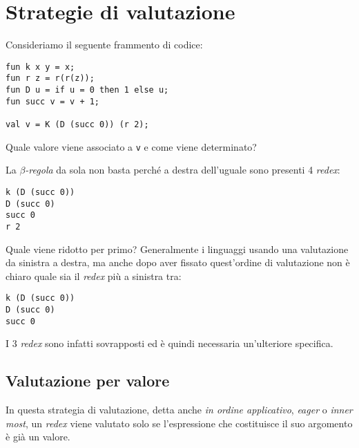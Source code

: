 \documentclass[12pt, a4paper]{report}
\theoremstyle{definition}
\newcommand{\code}[1]{\texttt{#1}}
\begin{document}
\newpage
\section{Strategie di valutazione}
Consideriamo il seguente frammento di codice:
\begin{lstlisting}[caption={Un'espressione con più redex},captionpos=b]
fun k x y = x;
fun r z = r(r(z));
fun D u = if u = 0 then 1 else u;
fun succ v = v + 1;

val v = K (D (succ 0)) (r 2);
\end{lstlisting}
Quale valore viene associato a \code{v} e come viene determinato?

La $\beta$\emph{-regola} da sola non basta perché a destra dell'uguale sono presenti
4 \emph{redex}:
\begin{lstlisting}
k (D (succ 0))
D (succ 0)
succ 0
r 2
\end{lstlisting}
Quale viene ridotto per primo? Generalmente i linguaggi usando una valutazione
da sinistra a destra, ma anche dopo aver fissato quest'ordine di valutazione
non è chiaro quale sia il \emph{redex} più a sinistra tra:
\begin{lstlisting}
k (D (succ 0))
D (succ 0)
succ 0
\end{lstlisting}
I 3 \emph{redex} sono infatti sovrapposti ed è quindi necessaria un'ulteriore
specifica.

\subsection{Valutazione per valore}
In questa strategia di valutazione, detta anche \emph{in ordine applicativo},
\emph{eager} o \emph{inner most}, un \emph{redex} viene valutato solo se l'espressione
che costituisce il suo argomento è già un valore.
\end{document}

